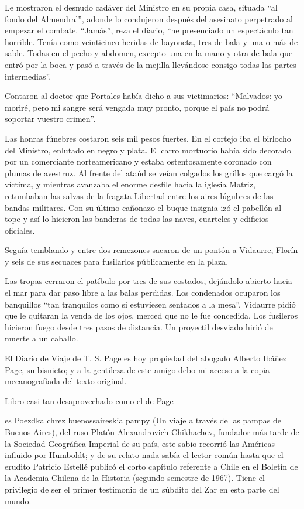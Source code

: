 \documentclass[10pt,twoside,openright]{memoir}
\begin{document}
Le mostraron el desnudo cadáver del Ministro en su propia casa, situada
``al fondo del Almendral'', adonde lo condujeron después del asesinato
perpetrado al empezar el combate. ``Jamás'', reza el diario, ``he
presenciado un espectáculo tan horrible. Tenía como veinticinco heridas
de bayoneta, tres de bala y una o más de sable. Todas en el pecho y
abdomen, excepto una en la mano y otra de bala que entró por la boca y
pasó a través de la mejilla llevándose consigo todas las partes
intermedias''.

Contaron al doctor que Portales había dicho a sus victimarios:
``Malvados: yo moriré, pero mi sangre será vengada muy pronto, porque el
país no podrá soportar vuestro crimen''.

Las honras fúnebres costaron seis mil pesos fuertes. En el cortejo iba
el birlocho del Ministro, enlutado en negro y plata. El carro mortuorio
había sido decorado por un comerciante norteamericano y estaba
ostentosamente coronado con plumas de avestruz. Al frente del ataúd se
veían colgados los grillos que cargó la víctima, y mientras avanzaba el
enorme desfile hacia la iglesia Matriz, retumbaban las salvas de la
fragata Libertad entre los aires lúgubres de las bandas militares. Con
su último cañonazo el buque insignia izó el pabellón al tope y así lo
hicieron las banderas de todas las naves, cuarteles y edificios
oficiales.

Seguía temblando y entre dos remezones sacaron de un pontón a Vidaurre,
Florín y seis de sus secuaces para fusilarlos públicamente en la plaza.

Las tropas cerraron el patíbulo por tres de sus costados, dejándolo
abierto hacia el mar para dar paso libre a las balas perdidas. Los
condenados ocuparon los banquillos ``tan tranquilos como si estuviesen
sentados a la mesa''. Vidaurre pidió que le quitaran la venda de los
ojos, merced que no le fue concedida. Los fusileros hicieron fuego desde
tres pasos de distancia. Un proyectil desviado hirió de muerte a un
caballo.

El Diario de Viaje de T. S. Page es hoy propiedad del abogado Alberto
Ibáñez Page, su bisnieto; y a la gentileza de este amigo debo mi acceso
a la copia mecanografiada del texto original.

Libro casi tan desaprovechado como el de Page

es Poezdka chrez buenossaireskia pampy (Un viaje a través de las pampas
de Buenos Aires), del ruso Platón Alexandrovich Chikhachev, fundador más
tarde de la Sociedad Geográfica Imperial de su país, este sabio recorrió
las Américas influido por Humboldt; y de su relato nada sabía el lector
común hasta que el erudito Patricio Estellé publicó el corto capítulo
referente a Chile en el Boletín de la Academia Chilena de la Historia
(segundo semestre de 1967). Tiene el privilegio de ser el primer
testimonio de un súbdito del Zar en esta parte del mundo.
\end{document}

